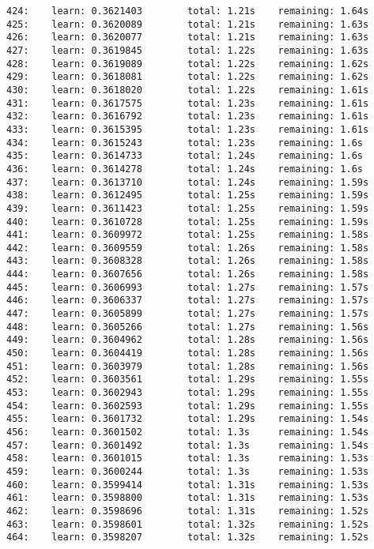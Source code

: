 \documentclass[11pt]{article}
\begin{document}
\begin{Verbatim}[commandchars=\\\{\}]
424:    learn: 0.3621403        total: 1.21s    remaining: 1.64s
425:    learn: 0.3620089        total: 1.21s    remaining: 1.63s
426:    learn: 0.3620077        total: 1.21s    remaining: 1.63s
427:    learn: 0.3619845        total: 1.22s    remaining: 1.63s
428:    learn: 0.3619089        total: 1.22s    remaining: 1.62s
429:    learn: 0.3618081        total: 1.22s    remaining: 1.62s
430:    learn: 0.3618020        total: 1.22s    remaining: 1.61s
431:    learn: 0.3617575        total: 1.23s    remaining: 1.61s
432:    learn: 0.3616792        total: 1.23s    remaining: 1.61s
433:    learn: 0.3615395        total: 1.23s    remaining: 1.61s
434:    learn: 0.3615243        total: 1.23s    remaining: 1.6s
435:    learn: 0.3614733        total: 1.24s    remaining: 1.6s
436:    learn: 0.3614278        total: 1.24s    remaining: 1.6s
437:    learn: 0.3613710        total: 1.24s    remaining: 1.59s
438:    learn: 0.3612495        total: 1.25s    remaining: 1.59s
439:    learn: 0.3611423        total: 1.25s    remaining: 1.59s
440:    learn: 0.3610728        total: 1.25s    remaining: 1.59s
441:    learn: 0.3609972        total: 1.25s    remaining: 1.58s
442:    learn: 0.3609559        total: 1.26s    remaining: 1.58s
443:    learn: 0.3608328        total: 1.26s    remaining: 1.58s
444:    learn: 0.3607656        total: 1.26s    remaining: 1.58s
445:    learn: 0.3606993        total: 1.27s    remaining: 1.57s
446:    learn: 0.3606337        total: 1.27s    remaining: 1.57s
447:    learn: 0.3605899        total: 1.27s    remaining: 1.57s
448:    learn: 0.3605266        total: 1.27s    remaining: 1.56s
449:    learn: 0.3604962        total: 1.28s    remaining: 1.56s
450:    learn: 0.3604419        total: 1.28s    remaining: 1.56s
451:    learn: 0.3603979        total: 1.28s    remaining: 1.56s
452:    learn: 0.3603561        total: 1.29s    remaining: 1.55s
453:    learn: 0.3602943        total: 1.29s    remaining: 1.55s
454:    learn: 0.3602593        total: 1.29s    remaining: 1.55s
455:    learn: 0.3601732        total: 1.29s    remaining: 1.54s
456:    learn: 0.3601502        total: 1.3s     remaining: 1.54s
457:    learn: 0.3601492        total: 1.3s     remaining: 1.54s
458:    learn: 0.3601015        total: 1.3s     remaining: 1.53s
459:    learn: 0.3600244        total: 1.3s     remaining: 1.53s
460:    learn: 0.3599414        total: 1.31s    remaining: 1.53s
461:    learn: 0.3598800        total: 1.31s    remaining: 1.53s
462:    learn: 0.3598696        total: 1.31s    remaining: 1.52s
463:    learn: 0.3598601        total: 1.32s    remaining: 1.52s
464:    learn: 0.3598207        total: 1.32s    remaining: 1.52s

\end{Verbatim}
\end{document}
